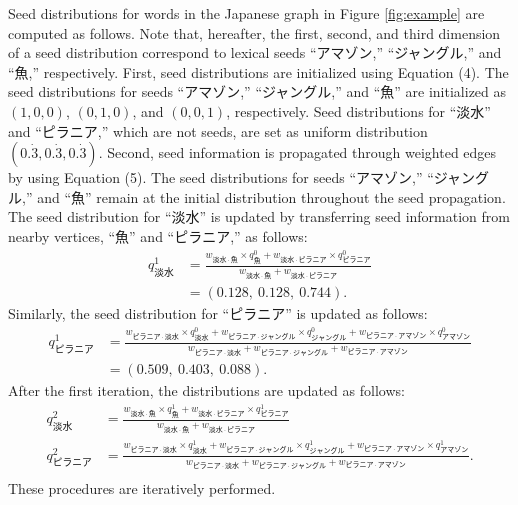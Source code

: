 \documentclass[english]{jnlp_1.4}
\begin{document}
Seed distributions for words in the Japanese graph in Figure \ref{fig:example} are computed as follows. 
Note that, hereafter, the first, second, and third dimension of a seed distribution correspond to lexical seeds ``アマゾン,'' ``ジャングル,'' and ``魚,'' respectively. 
First, seed distributions are initialized using Equation (4). 
The seed distributions for seeds ``アマゾン,'' ``ジャングル,'' and ``魚'' are initialized as $(1,0,0)$, $(0,1,0)$, and $(0,0,1)$, respectively. 
Seed distributions for  ``淡水'' and  ``ピラニア,'' which are not seeds, are set as uniform distribution $(0.\dot{3}, 0.\dot{3}, 0.\dot{3})$. 
Second, seed information is propagated through weighted edges by using Equation (5). 
The seed distributions for seeds ``アマゾン,'' ``ジャングル,'' and ``魚'' remain at the initial distribution throughout the seed propagation. 
The seed distribution for ``淡水'' is updated by transferring seed information from nearby vertices, ``魚'' and ``ピラニア,'' as follows: 
\begin{align*}
 q^1_{淡水} & = \frac{w_{淡水 \cdot 魚} \times q^0_{魚} + w_{淡水 \cdot ピラニア} \times q^0_{ピラニア}}{w_{淡水 \cdot 魚}+w_{淡水 \cdot ピラニア}} \\
  & = (0.128,\ 0.128,\ 0.744).
\end{align*}
Similarly, the seed distribution for ``ピラニア'' is updated as follows: 
\begin{align*}
 q^1_{ピラニア} & = \frac{w_{ピラニア \cdot 淡水} \times q^0_{淡水} + w_{ピラニア \cdot ジャングル} \times q^0_{ジャングル} + w_{ピラニア \cdot アマゾン} \times q^0_{アマゾン}}{w_{ピラニア \cdot 淡水}+w_{ピラニア \cdot ジャングル}+w_{ピラニア \cdot アマゾン}} \\
  & =  (0.509,\ 0.403,\ 0.088).
\end{align*}
After the first iteration, the distributions are updated as follows: 
\begin{align*}
 q^2_{淡水} &= \frac{w_{淡水 \cdot 魚} \times q^1_{魚} + w_{淡水 \cdot ピラニア} \times q^1_{ピラニア}}{w_{淡水 \cdot 魚}+w_{淡水 \cdot ピラニア}} \\
 q^2_{ピラニア} &= \frac{w_{ピラニア \cdot 淡水} \times q^1_{淡水} + w_{ピラニア \cdot ジャングル} \times q^1_{ジャングル} + w_{ピラニア \cdot アマゾン} \times q^1_{アマゾン}}{w_{ピラニア \cdot 淡水}+w_{ピラニア \cdot ジャングル}+w_{ピラニア \cdot アマゾン}}. \\
\end{align*}
These procedures are iteratively performed. 
\end{document}
